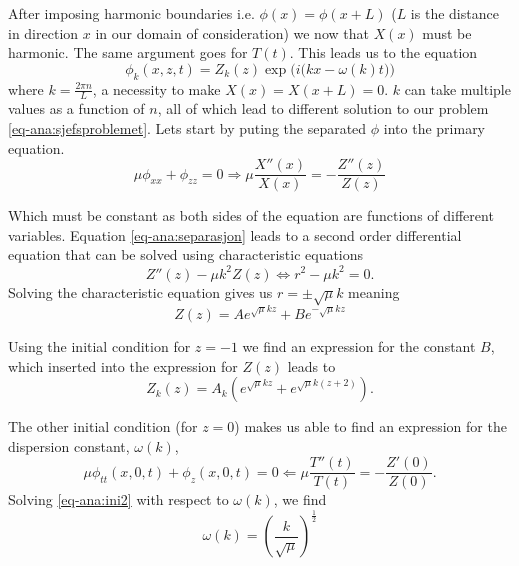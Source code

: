 \documentclass[11pt]{article}
\begin{document}
After imposing harmonic boundaries i.e. $\phi(x) = \phi(x+L)$ ($L$ is the distance in direction $x$ in our domain of consideration)
we now that $X(x)$ must be harmonic. The same argument goes for $T(t)$. This leads us to the equation
\begin{equation*}
\phi_k (x,z,t) = Z_k(z) \exp \Big( i \big( kx - \omega(k)t \big) \Big)
\end{equation*}
where $k=\frac{2 \pi n}{L}$, a necessity to make $X(x) = X(x+L) = 0$. $k$ can take multiple values as a function of $n$,
all of which lead to different solution to our problem \eqref{eq-ana:sjefsproblemet}. Lets start by puting the separated $\phi$ into the primary equation.
\begin{equation}
\mu \phi_{xx} + \phi_{zz} = 0 \Longrightarrow \mu \frac{X '' (x)}{X(x)} = -\frac{Z '' (z)}{Z(z)}
\label{eq-ana:separasjon}
\end{equation}

Which must be constant as both sides of the equation are functions of different variables. Equation \eqref{eq-ana:separasjon}
leads to a second order differential equation that can be solved using characteristic equations
\begin{equation*}
Z''(z) - \mu k^2 Z(z) \Longleftrightarrow r^2 - \mu k^2 = 0.
\end{equation*}
Solving the characteristic equation gives us $r = \pm \sqrt{\mu}k$ meaning
\begin{equation*}
Z(z) = A e^{\sqrt{\mu}k z} + Be^{-\sqrt{\mu}k z}
\end{equation*}

Using the initial condition for $z = -1$ we find an expression for the constant $B$, which inserted into the expression for $Z(z)$ leads to
\begin{equation*}
Z_k(z) = A_k \left( e^{\sqrt{\mu}kz} + e^{ \sqrt{\mu}k(z+2) } \right).
\end{equation*}

The other initial condition (for $z=0$) makes us able to find an expression for the dispersion constant, $\omega(k)$,
\begin{equation}
\mu \phi_{tt}(x,0,t) + \phi_{z}(x,0,t) = 0 \Longleftarrow \mu \frac{T''(t)}{T(t)} = - \frac{Z'(0)}{Z(0)}.
\label{eq-ana:ini2}
\end{equation}
Solving \eqref{eq-ana:ini2} with respect to $\omega(k)$, we find
\begin{equation*}
\omega(k) = \left( \frac{k}{\sqrt{\mu}} \right)^{\frac{1}{2}}
\end{equation*}
\end{document}
